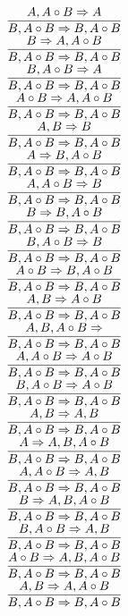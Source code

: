 \documentclass[11pt]{article}
\begin{document}
\begin{center}
\bigskip
\\$\infer{B, A\circ B\Rightarrow B, A\circ B}{A, A\circ B\Rightarrow A}$
\bigskip
\\$\infer{B, A\circ B\Rightarrow B, A\circ B}{B\Rightarrow A, A\circ B}$
\bigskip
\\$\infer{B, A\circ B\Rightarrow B, A\circ B}{B, A\circ B\Rightarrow A}$
\bigskip
\\$\infer{B, A\circ B\Rightarrow B, A\circ B}{A\circ B\Rightarrow A, A\circ B}$
\bigskip
\\$\infer{B, A\circ B\Rightarrow B, A\circ B}{A, B\Rightarrow B}$
\bigskip
\\$\infer{B, A\circ B\Rightarrow B, A\circ B}{A\Rightarrow B, A\circ B}$
\bigskip
\\$\infer{B, A\circ B\Rightarrow B, A\circ B}{A, A\circ B\Rightarrow B}$
\bigskip
\\$\infer{B, A\circ B\Rightarrow B, A\circ B}{B\Rightarrow B, A\circ B}$
\bigskip
\\$\infer{B, A\circ B\Rightarrow B, A\circ B}{B, A\circ B\Rightarrow B}$
\bigskip
\\$\infer{B, A\circ B\Rightarrow B, A\circ B}{A\circ B\Rightarrow B, A\circ B}$
\bigskip
\\$\infer{B, A\circ B\Rightarrow B, A\circ B}{A, B\Rightarrow A\circ B}$
\bigskip
\\$\infer{B, A\circ B\Rightarrow B, A\circ B}{A, B, A\circ B\Rightarrow }$
\bigskip
\\$\infer{B, A\circ B\Rightarrow B, A\circ B}{A, A\circ B\Rightarrow A\circ B}$
\bigskip
\\$\infer{B, A\circ B\Rightarrow B, A\circ B}{B, A\circ B\Rightarrow A\circ B}$
\bigskip
\\$\infer{B, A\circ B\Rightarrow B, A\circ B}{A, B\Rightarrow A, B}$
\bigskip
\\$\infer{B, A\circ B\Rightarrow B, A\circ B}{A\Rightarrow A, B, A\circ B}$
\bigskip
\\$\infer{B, A\circ B\Rightarrow B, A\circ B}{A, A\circ B\Rightarrow A, B}$
\bigskip
\\$\infer{B, A\circ B\Rightarrow B, A\circ B}{B\Rightarrow A, B, A\circ B}$
\bigskip
\\$\infer{B, A\circ B\Rightarrow B, A\circ B}{B, A\circ B\Rightarrow A, B}$
\bigskip
\\$\infer{B, A\circ B\Rightarrow B, A\circ B}{A\circ B\Rightarrow A, B, A\circ B}$
\bigskip
\\$\infer{B, A\circ B\Rightarrow B, A\circ B}{A, B\Rightarrow A, A\circ B}$

\end{center}
\end{document}

